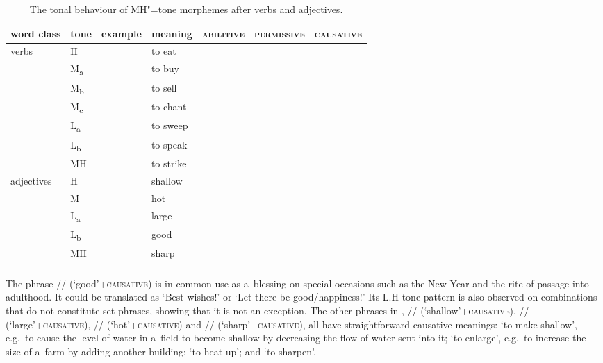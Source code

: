 \begin{table}%
 \caption{\label{tab:thetonalbehaviourofmh}The tonal behaviour of MH"=tone morphemes after verbs and adjectives.}
{\setlength\tabcolsep{4.5pt}
\begin{tabularx}{\textwidth}{ l l l l l l Q }
\lsptoprule
	word class & tone & example & meaning & \textsc{abilitive} & \textsc{permissive} & \textsc{causative}\\ \midrule
	verbs &	H &  & to eat &  &  & \\
	& M\textsubscript{a} &  & to buy &  &  & \\
	& M\textsubscript{b} &  & to sell &  &  & \\
	& M\textsubscript{c} &  & to chant &  &  & \\
	& L\textsubscript{a} &  & to sweep &  &  & \\
	& L\textsubscript{b} &  & to speak &  &  & \\
	& MH &  & to strike &  &  &
   \\ \midrule
	adjectives & H &  & shallow &  &  & \\
	& M &  & hot &  &  & \\
	& L\textsubscript{a} &  & large &  &  & \\
	& L\textsubscript{b} &  & good &  &  & \\
	& MH &  & sharp &  &  & \\
\lspbottomrule
\end{tabularx}}
\end{table}

The phrase // (‘good’+\textsc{causative}) is in common use as a~blessing on special
occasions such as the New Year and the rite of passage into adulthood. It could be translated as
‘Best wishes!’ or ‘Let there be good/happiness!’ Its L.H tone pattern is also observed on combinations that do not constitute set phrases, showing that it is not an exception. The other phrases in , //
(‘shallow’+\textsc{causative}), //
(‘large’+\textsc{causative}), // (‘hot’+\textsc{causative}) and //
(‘sharp’+\textsc{causative}), all have straightforward causative meanings: ‘to make shallow’, e.g.~to
cause the level of water in a~field to become shallow by decreasing the flow of water sent into it; ‘to enlarge’, e.g.~to
increase the size of a~farm by adding another building; ‘to heat up’; and ‘to sharpen’.

